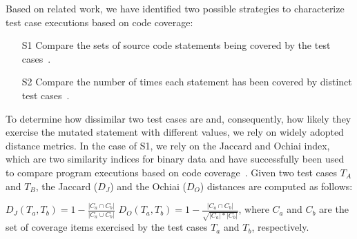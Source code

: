 
Based on related work, we have identified two possible strategies to characterize test case executions based on code coverage:
\begin{itemize}
\item[S1] Compare the sets of source code statements being covered by the test cases~\cite{grun2009impact}.
\item[S2] Compare the number of times each statement has been covered by distinct test cases~\cite{schuler2013covering}.
\end{itemize}


To determine how dissimilar two test cases are and, consequently, how likely they exercise the mutated statement with different values, we rely on widely adopted distance metrics. 
In the case of S1, we rely on the Jaccard and Ochiai index, which are two similarity indices for binary data and have successfully been used to compare program executions based on code coverage~\cite{Zou:Ochiai:2019,Keller:Jaccard:2017,Briand:2019}. 
Given two test cases $T_A$ and $T_B$, the Jaccard  ($D_J$) and the Ochiai ($D_O$) distances are computed as follows:

$D_J(T_a,T_b)=1-\frac{|C_a \cap C_b|}{|C_a \cup C_b|}$ \hspace{2mm} $D_O(T_a,T_b)=1-\frac{|C_a \cap C_b|}{\sqrt{|C_a| * |C_b|}}$, 
where $C_a$ and $C_b$ are the set of coverage items exercised by the test cases $T_a$ and $T_b$, respectively.

